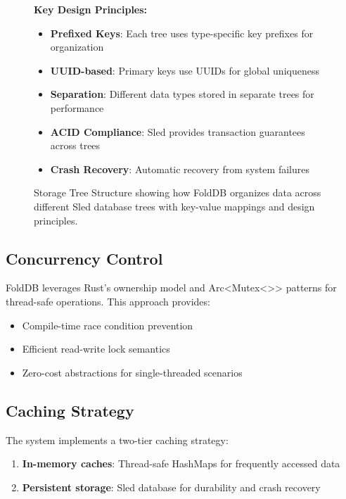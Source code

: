\documentclass[11pt,a4paper]{article}
\begin{document}
\begin{figure}[htbp]
\vspace{0.5cm}

\textbf{Key Design Principles:}
\begin{itemize}
\item \textbf{Prefixed Keys}: Each tree uses type-specific key prefixes for organization
\item \textbf{UUID-based}: Primary keys use UUIDs for global uniqueness
\item \textbf{Separation}: Different data types stored in separate trees for performance
\item \textbf{ACID Compliance}: Sled provides transaction guarantees across trees
\item \textbf{Crash Recovery}: Automatic recovery from system failures
\end{itemize}

\caption{Storage Tree Structure showing how FoldDB organizes data across different Sled database trees with key-value mappings and design principles.}
\label{fig:storage_tree}
\end{figure}

\subsection{Concurrency Control}

FoldDB leverages Rust's ownership model and Arc<Mutex<>> patterns for thread-safe operations. This approach provides:

\begin{itemize}
\item Compile-time race condition prevention
\item Efficient read-write lock semantics
\item Zero-cost abstractions for single-threaded scenarios
\end{itemize}

\subsection{Caching Strategy}

The system implements a two-tier caching strategy:

\begin{enumerate}
\item \textbf{In-memory caches}: Thread-safe HashMaps for frequently accessed data
\item \textbf{Persistent storage}: Sled database for durability and crash recovery
\end{enumerate}
\end{document}
